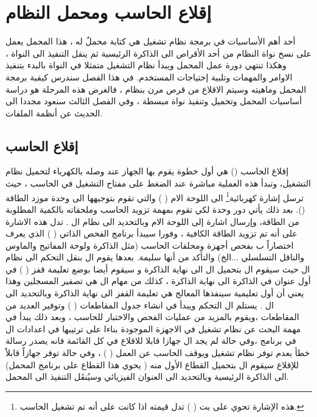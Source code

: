 \documentclass[document.tex]{subfiles}
\begin{document}
\chapter{إقلاع الحاسب ومحمل النظام }
أحد أهم الأساسيات في برمجة نظام تشغيل هي كتابة محملٌ له ، هذا المحمل يعمل على نسخ نواة النظام من أحد الأقراص الى الذاكرة الرئيسية ثم ينقل التنفيذ الى النواة ، وهكذا تنتهي دورة عمل المحمل ويبدأ نظام التشغيل متمثلا في النواة بالبدء بتنفيذ الاوامر والمهمات وتلبية إحتياجات المستخدم. في هذا الفصل سندرس كيفية برمجة المحمل وماهيته وسيتم الاقلاع من قرص مرن بنظام  ، فالغرض هذه المرحلة هو دراسة أساسيات المحمل وتحميل وتنفيذ نواة مبسطة ، وفي الفصل الثالث سنعود مجددا الى الحديث عن أنظمة الملفات.

\section{إقلاع الحاسب}

إقلاع الحاسب () هي أول خطوة يقوم بها الجهاز عند وصله بالكهرباء لتحميل نظام التشغيل، وتبدأ هذه العملية مباشرة عند الضغط على مفتاح التشغيل في الحاسب ، حيث ترسل إشارة كهربائية\footnote{هذه الإشارة تحوي على بت (  ) تدل قيمته اذا كانت  على أنه تم تشغيل الحاسب.} الى اللوحة الام (  ) والتي تقوم بتوجيهها الى وحدة موزد الطاقة (). بعد ذلك يأتي دور وحدة  لكي تقوم بمهمة تزويد الحاسب وملحقاته بالكمية المطلوبة من الطاقة، وإرسال اشارة  إلى اللوحة الام وبالتحديد الى نظام ال  .
تدل هذه الاشارة على أنه تم تزويد الطاقة الكافية ، وفورا سيبدأ برنامج الفحص الذاتي (  ) الذي يعرف اختصاراً ب  بفحص أجهزة ومحلقات الحاسب (مثل الذاكرة ولوحة المفاتيح والماوس والناقل التسلسلي ...الخ) والتأكد من أنها سليمة.
بعدها يقوم ال  بنقل التحكم الى نظام ال  حيث سيقوم ال  بتحميل ال  الى نهاية الذاكرة  و سيقوم أيضا بوضع تعليمة قفز (  ) في أول عنوان في الذاكرة الى نهاية الذاكرة ، كذلك من مهام ال  هي تصفير المسجلين  وهذا يعني أن أول تعليمية سينفذها المعالج هي تعليمة القفز الى نهاية الذاكرة وبالتحديد الى ال  .
يستلم ال  التحكم ويبدأ في انشاء جدول المقاطعات (  ) وتوفير العديد من المقاطعات ،ويقوم بالمزيد من عمليات الفحص والاختبار للحاسب ، وبعد ذلك يبدأ في مهمة البحث عن نظام تشغيل في الاجهزة الموجودة بناءا على ترتيبها في اعدادات ال  في برنامج  ،وفي حالة لم يجد ال  جهازا قابلا للاقلاع في كل القائمة فانه يصدر رسالة خطأ بعدم توفر نظام تشغيل ويوقف الحاسب عن العمل (  ) ، وفي حالة توفر جهازاً قابلاً للإقلاع سيقوم ال  بتحميل القطاع الأول منه ( يحوي هذا القطاع على برنامج المحمل) الى الذاكرة الرئيسية وبالتحديد الى العنوان الفيزيائي  وسيُنقَل التنفيذ الى المحمل.\\
\end{document}
